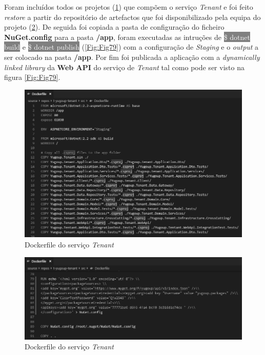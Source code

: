 \hspace{1cm}Foram incluídos todos os projetos (\ref{Fig:Fig77}) que compõem o serviço \textit{Tenant} e foi feito \textit{restore} a partir do repositório de artefactos que foi disponibilizado pela equipa do projeto (\ref{Fig:Fig78}). De seguida foi copiada a pasta de configuração do ficheiro \textbf{NuGet.config} para a pasta \textbf{/app}, foram executadas as intruções de \colorbox{gray}{\textcolor{white}{\$ dotnet build}} e \colorbox{gray}{\textcolor{white}{\$ dotnet publish}} (\ref{Fig:Fig79}) com a configuração de \textit{Staging} e o \textit{output} a ser colocado na pasta \textbf{/app}. Por fim foi publicada a aplicação com a \textit{dynamically linked library} da \textbf{Web API} do serviço de \textit{Tenant} tal como pode ser visto na figura \ref{Fig:Fig79}.

\begin{figure}[hbt!]
\centering
\includegraphics[width=0.9\linewidth]{Cap6/TenantDockerfileCSPROJ.png}
\caption{Dockerfile do serviço \textit{Tenant}}
\label{Fig:Fig77}
\end{figure}


\begin{figure}[hbt!]
\centering
\includegraphics[width=0.9\linewidth]{Cap6/TenantDockerfileNuGetConfig.png}
\caption{Dockerfile do serviço \textit{Tenant}}
\label{Fig:Fig78}
\end{figure}

